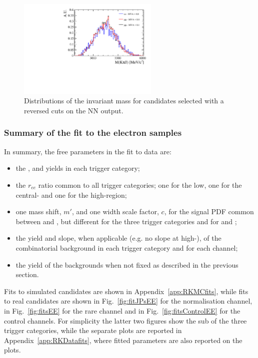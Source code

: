 \begin{figure}[t!]
\vspace{1cm}

\centering
\includegraphics[width=0.6\textwidth]{RKst/figs/Background/highq2_comb.pdf}
\caption{Distributions of the \mKpill invariant mass for \BdToKstll candidates selected with a reversed cuts on the NN output.}
\label{fig:highq2_comb}
\end{figure}

\clearpage

\subsubsection{Summary of the fit to the electron samples}

In summary, the free parameters in the fit to data are:
%
\begin{itemize}
\item the \BdToKstJPsee, \BdToKstPsiee and \BdToKstGee yields in each trigger category;
\item the $r_{ee}$ ratio common to all trigger categories; one for the low, one for the central- and one for the high-\qsq region;
\item one mass shift, $m'$, and one width scale factor, $c$, for the signal PDF common between \BdToKstJPsee and \BdToKstee,
but different for the three trigger categories and for \BdToKstPsiee and \BdToKstGee;
\item the yield and slope, when applicable (e.g. no slope at high-\qsq), of the combinatorial background in each trigger category and for each channel;
\item the yield of the backgrounds when not fixed as described in the previous section.
\end{itemize}

Fits to simulated \BdToKstJPsee candidates are shown in Appendix~\ref{app:RKMCfits}, while
fits to real candidates are shown in Fig.~\ref{fig:fitJPsEE} for the normalisation channel, in Fig.~\ref{fig:fitsEE} 
for the rare channel and in Fig.~\ref{fig:fitsControlEE} for the control channels.
For simplicity the latter two figures show the sub of the three trigger categories, while the separate plots are
reported in Appendix~\ref{app:RKDatafits}, where fitted parameters are also reported on the plots.

